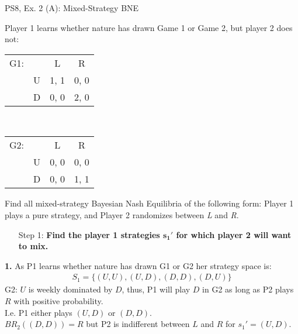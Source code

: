 \begin{frame}{PS8, Ex. 2 (A): Mixed-Strategy BNE}
    \begin{multicols}{2}
      Player 1 learns whether nature has drawn Game 1 or Game 2, but player 2 does not:
      \begin{table}
        \begin{tabular}{ll|c|c|}
          \multicolumn{1}{c}{G1:} & \multicolumn{1}{c}{} & \multicolumn{1}{c}{L} & \multicolumn{1}{c}{R} \\\cline{3-4}
          & U & 1, 1 & 0, 0 \\\cline{3-4}
          & D & 0, 0 & 2, 0 \\\cline{3-4}
        \end{tabular}\\\bigskip
        \begin{tabular}{ll|c|c|}
          \multicolumn{1}{c}{G2:} & \multicolumn{1}{c}{} & \multicolumn{1}{c}{L} & \multicolumn{1}{c}{R} \\\cline{3-4}
          & U & 0, 0 & 0, 0 \\\cline{3-4}
          & D & 0, 0 & 1, 1 \\\cline{3-4}
        \end{tabular}
      \end{table}
      Find all mixed-strategy Bayesian Nash Equilibria of the following form: Player 1 plays a pure strategy, and Player 2 randomizes between \textit{L} and \textit{R}.
      \begin{itemize}
        \item[Step 1:] \textbf{Find the player 1 strategies $\bm{s_1'}$ for which player 2 will want to mix.}
      \end{itemize}
      \vfill\null\columnbreak
      \textbf{1.} As P1 learns whether nature has drawn G1 or G2 her strategy space is:
      \begin{align*}
        S_1=\{(U,U),(U,D),(D,D),(D,U)\}
      \end{align*}
      G2: $U$ is weekly dominated by $D$, thus, P1 will play $D$ in G2 as long as P2 plays $R$ with positive probability.\\\medskip I.e. P1 either plays $(U,D)$ or $(D,D)$.\\\medskip
      $BR_2((D,D))=R$ but P2 is indifferent between $L$ and $R$ for $s_1'=(U,D)$.
      \vfill\null
    \end{multicols}
\end{frame}
